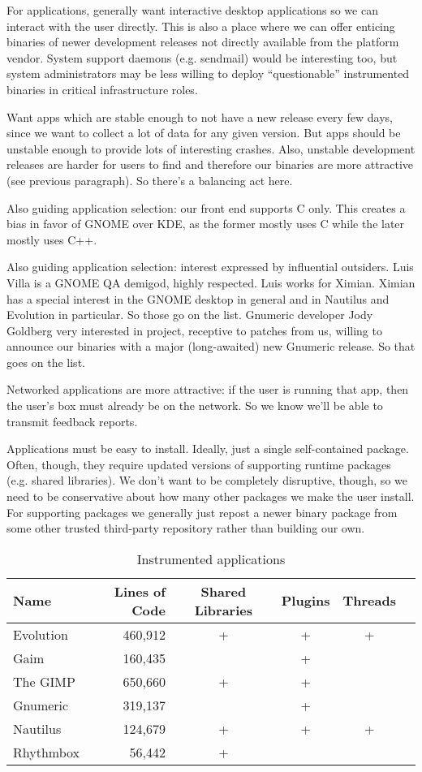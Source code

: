 \documentclass[times,10pt,twocolumn]{article}
\begin{document}
For applications, generally want interactive desktop applications so
we can interact with the user directly.  This is also a place where we
can offer enticing binaries of newer development releases not directly
available from the platform vendor.  System support daemons (e.g.
sendmail) would be interesting too, but system administrators may be
less willing to deploy ``questionable'' instrumented binaries in
critical infrastructure roles.

Want apps which are stable enough to not have a new release every few
days, since we want to collect a lot of data for any given version.
But apps should be unstable enough to provide lots of interesting
crashes.  Also, unstable development releases are harder for users to
find and therefore our binaries are more attractive (see previous
paragraph).  So there's a balancing act here.

Also guiding application selection: our front end supports C only.
This creates a bias in favor of GNOME over KDE, as the former mostly
uses C while the later mostly uses C++.

Also guiding application selection: interest expressed by influential
outsiders.  Luis Villa is a GNOME QA demigod, highly respected.  Luis
works for Ximian.  Ximian has a special interest in the GNOME desktop
in general and in Nautilus and Evolution in particular.  So those go
on the list.  Gnumeric developer Jody Goldberg very interested in
project, receptive to patches from us, willing to announce our
binaries with a major (long-awaited) new Gnumeric release.  So that
goes on the list.

Networked applications are more attractive: if the user is running
that app, then the user's box must already be on the network.  So we
know we'll be able to transmit feedback reports.

Applications must be easy to install.  Ideally, just a single
self-contained package.  Often, though, they require updated versions
of supporting runtime packages (e.g. shared libraries).  We don't want
to be completely disruptive, though, so we need to be conservative
about how many other packages we make the user install.  For
supporting packages we generally just repost a newer binary package
from some other trusted third-party repository rather than building
our own.

\begin{table*}
  \centering
  \begin{tabular}{lrcccc}
    Name & Lines of Code & Shared Libraries & Plugins & Threads \\\hline
    Evolution & 460,912 & + & + & + \\
    Gaim & 160,435 & & + & \\
    The GIMP & 650,660 & + & + & \\
    Gnumeric & 319,137 & & + & \\
    Nautilus & 124,679 & + & + & + \\
    Rhythmbox & 56,442 & + & &
  \end{tabular}
  \caption{Instrumented applications}
  \label{apps}
\end{table*}
\end{document}
